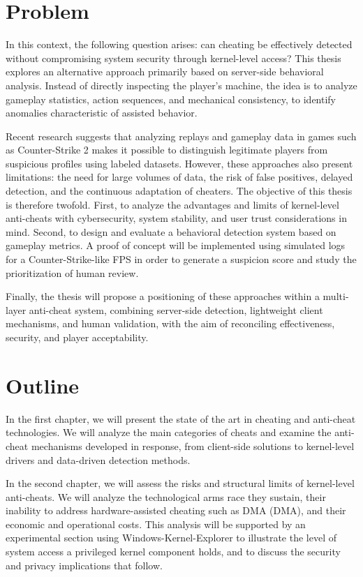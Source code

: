 \section*{Problem}

In this context, the following question arises: can cheating be effectively detected without compromising system security through kernel-level access? This thesis explores an alternative approach primarily based on \gls{server}-side behavioral analysis. Instead of directly inspecting the player’s machine, the idea is to analyze gameplay statistics, action sequences, and mechanical consistency, to identify anomalies characteristic of assisted behavior.

Recent research suggests that analyzing replays and gameplay data in games such as Counter-Strike 2 makes it possible to distinguish legitimate players from suspicious profiles using labeled datasets. However, these approaches also present limitations: the need for large volumes of data, the risk of false positives, delayed detection, and the continuous adaptation of cheaters. The objective of this thesis is therefore twofold. First, to analyze the advantages and limits of kernel-level anti-cheats with cybersecurity, system stability, and user trust considerations in mind. Second, to design and evaluate a behavioral detection system based on gameplay metrics. A proof of concept will be implemented using simulated logs for a Counter-Strike-like \gls{FPS} in order to generate a suspicion score and study the prioritization of human review.

Finally, the thesis will propose a positioning of these approaches within a multi-layer anti-cheat system, combining server-side detection, lightweight client mechanisms, and human validation, with the aim of reconciling effectiveness, security, and player acceptability.

\section*{Outline}

In the first chapter, we will present the state of the art in cheating and anti-cheat technologies. We will analyze the main categories of cheats and examine the anti-cheat mechanisms developed in response, from client-side solutions to kernel-level \glspl{driver} and data-driven detection methods.

In the second chapter, we will assess the risks and structural limits of kernel-level anti-cheats. We will analyze the technological arms race they sustain, their inability to address hardware-assisted cheating such as \gls{DMA} (DMA), and their economic and operational costs. This analysis will be supported by an experimental section using Windows-Kernel-Explorer to illustrate the level of system access a privileged kernel component holds, and to discuss the security and privacy implications that follow.

